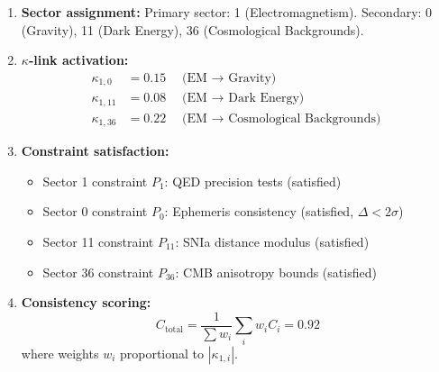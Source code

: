 \documentclass[13pt,a4paper]{article}
\begin{document}
	\begin{enumerate}[leftmargin=*]
		\item \textbf{Sector assignment:} Primary sector: 1 (Electromagnetism). Secondary: 0 (Gravity), 11 (Dark Energy), 36 (Cosmological Backgrounds).
		
		\item \textbf{$\kappa$-link activation:}
		\begin{align*}
			\kappa_{1,0} &= 0.15 \quad \text{(EM $\to$ Gravity)} \\
			\kappa_{1,11} &= 0.08 \quad \text{(EM $\to$ Dark Energy)} \\
			\kappa_{1,36} &= 0.22 \quad \text{(EM $\to$ Cosmological Backgrounds)}
		\end{align*}
		
		\item \textbf{Constraint satisfaction:}
		\begin{itemize}
			\item Sector 1 constraint $P_1$: QED precision tests (satisfied)
			\item Sector 0 constraint $P_0$: Ephemeris consistency (satisfied, $\Delta < 2\sigma$)
			\item Sector 11 constraint $P_{11}$: SNIa distance modulus (satisfied)
			\item Sector 36 constraint $P_{36}$: CMB anisotropy bounds (satisfied)
		\end{itemize}
		
		\item \textbf{Consistency scoring:}
		\[
		C_{\text{total}} = \frac{1}{\sum w_i}\sum_i w_i C_i = 0.92
		\]
		where weights $w_i$ proportional to $|\kappa_{1,i}|$.
	\end{enumerate}
	
\end{document}
